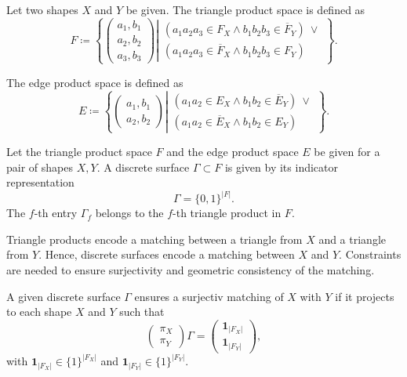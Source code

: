 \begin{definition}
	Let two shapes $X$ and $Y$ be given.
	The triangle product space is defined as
	\begin{equation}
		F \coloneqq \left\{ 
		\begin{pmatrix}
			a_1, b_1 \\
			a_2, b_2 \\ 
			a_3, b_3
		\end{pmatrix} \left|
		\begin{array}{ll}
			(a_1 a_2 a_3 \in F_X \wedge b_1 b_2 b_3 \in \overline{F}_Y )~\vee \\
			(a_1 a_2 a_3 \in \overline{F}_X \wedge b_1 b_2 b_3 \in {F}_Y ) 
		\end{array} \right.
		\right\}.\nonumber
	\end{equation}
	
	The edge product space is defined as
	\begin{equation}
		E \coloneqq \left\{ 
		\begin{pmatrix}
			a_1, b_1 \\
			a_2, b_2
		\end{pmatrix} \left|
		\begin{array}{ll}
			(a_1 a_2 \in E_X \wedge b_1 b_2 \in \overline{E}_Y )~\vee\\
			(a_1 a_2 \in \overline{E}_X \wedge b_1 b_2 \in {E}_Y )
		\end{array} \right.
		\right\}.\nonumber
	\end{equation}
\end{definition}

\begin{definition}
	Let the triangle product space $F$ and the edge product space $E$ be given for a pair of shapes $X, Y$. A discrete surface $\Gamma \subset F$  is given by its indicator representation 
	\begin{equation}
		\Gamma = \{0, 1\}^{|F|}.
	\end{equation}
	The $f$-th entry $\Gamma_f$ belongs to the $f$-th triangle product in $F$.
\end{definition}
Triangle products encode a matching between a triangle from $X$ and a triangle from $Y$. Hence, discrete surfaces encode a matching between $X$ and $Y$. Constraints are needed to ensure surjectivity and geometric consistency of the matching. 
\begin{definition}
	A given discrete surface $\Gamma$ ensures a surjectiv matching of $X$ with $Y$ if it projects to each shape $X$ and $Y$ such that
	\begin{equation}
			\begin{pmatrix}
			\pi_X \\ \pi_Y
		\end{pmatrix}
		\Gamma
		= 
		\begin{pmatrix}
			\boldsymbol{1}_{|F_X|} \\ \boldsymbol{1}_{|F_Y|}
		\end{pmatrix},
	\end{equation}
	with $\boldsymbol{1}_{|F_X|} \in \{1\}^{|F_X|}$ and $\boldsymbol{1}_{|F_Y|} \in \{1\}^{|F_Y|}$.
\end{definition}


